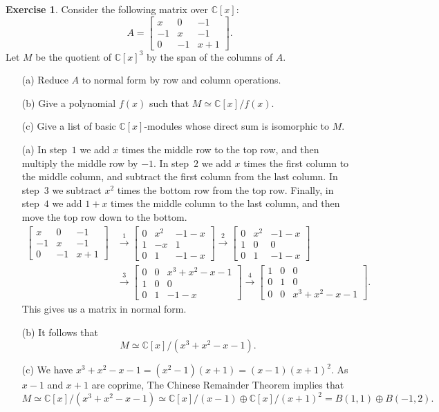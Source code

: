\documentclass{amsart}
\newcommand{\bbm}       {\left[\begin{matrix}}
\newcommand{\ebm}       {\end{matrix}\right]}
\newcommand{\C}         {{\mathbb{C}}}
\newcommand{\xra}       {\xrightarrow}
\newcommand{\ip}[1]     {\langle #1\rangle}
\newcommand{\op}        {\oplus}
\renewcommand{\:}{\colon}
\theoremstyle{definition}
\newtheorem{exercise}{Exercise}[section]
\renewenvironment{solution}{\SolutionAtEnd}{\endSolutionAtEnd}
\begin{document}
\begin{exercise}
 Consider the following matrix over $\C[x]$:
 \[ A = \bbm x & 0 & -1 \\ -1 & x & -1 \\ 0 & -1 & x+1 \ebm. \]
 Let $M$ be the quotient of $\C[x]^3$ by the span of the columns of
 $A$. 
 \begin{itemize}
  \item[(a)] Reduce $A$ to normal form by row and column operations.
  \item[(b)] Give a polynomial $f(x)$ such that $M\simeq\C[x]/f(x)$.
  \item[(c)] Give a list of basic $\C[x]$-modules whose direct sum is
   isomorphic to $M$.
 \end{itemize}
\end{exercise}
\begin{solution}
 \begin{itemize}
  \item[(a)]
   In step~$1$ we add $x$ times the middle row to the top row, and
   then multiply the middle row by $-1$.  In step~$2$ we add $x$ times
   the first column to the middle column, and subtract the first
   column from the last column.  In step~$3$ we subtract $x^2$ times
   the bottom row from the top row.  Finally, in step~$4$ we add $1+x$
   times the middle column to the last column, and then move the top
   row down to the bottom. 
   \begin{align*}
    \bbm x & 0 & -1 \\ -1 & x & -1 \\ 0 & -1 & x+1 \ebm &\xra{1}
    \bbm 0 & x^2 & -1-x \\ 1 &-x &1 \\ 0 & 1 & -1-x \ebm \xra{2}
    \bbm 0 & x^2 & -1-x \\ 1 &0 &0 \\ 0 & 1 & -1-x \ebm \\
    &\xra{3}
    \bbm 0&0& x^3+x^2-x-1 \\ 1&0&0 \\ 0 & 1 & -1-x \ebm \xra{4}
    \bbm 1&0&0 \\ 0&1&0 \\ 0&0&x^3+x^2-x-1 \ebm.
   \end{align*}
   This gives us a matrix in normal form.
  \item[(b)] It follows that 
   \[ M\simeq \C[x]/(x^3+x^2-x-1). \]
  \item[(c)] We have $x^3+x^2-x-1=(x^2-1)(x+1)=(x-1)(x+1)^2$.  As
   $x-1$ and $x+1$ are coprime, The Chinese Remainder Theorem implies
   that 
   \[ M \simeq \C[x]/(x^3+x^2-x-1) \simeq
        \C[x]/(x-1) \op \C[x]/(x+1)^2 = B(1,1) \op B(-1,2). 
   \]
 \end{itemize}
\end{solution}
\end{document}

